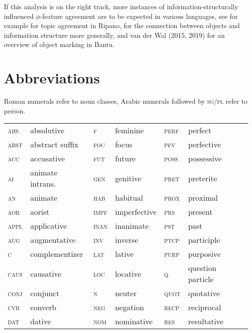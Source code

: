 \documentclass[output=paper
,modfonts
,nonflat]{langsci/langscibook}
\begin{document}
If this analysis is on the right track, more instances of information-structurally influenced $ \phi $-feature agreement are to be expected in various languages, see for example  for topic agreement in Ripano, \citet{Dalrymple_Nikolaeva2011} for the connection between objects and information structure more generally, and van der Wal (2015, 2019) for an overview of object marking in Bantu. \nocite{Van_der_Wal2015,chapters/07-van-der-wal} %

\section*{Abbreviations}
Roman numerals refer to noun classes, Arabic numerals followed by \textsc{sg/pl} refer to person.

\noindent\begin{tabular}{@{}llllll@{}} 
	\textsc{abs} 	&	 absolutive 	&	\textsc{f} 	&	  feminine 	&	  \textsc{perf} 	&	   perfect 	\\
\textsc{abst} 	&	  abstract suffix 	&	  \textsc{foc} 	&	  focus	&	  \textsc{pfv} 	&	  perfective 	\\
\textsc{acc} 	&	  accusative 	&	  \textsc{fut} 	&	  future	&	  \textsc{poss}  	&	 possessive 	\\
\textsc{ai} 	&	  animate intrans. 	&	  \textsc{gen} 	&	  genitive  	&	  \textsc{pret} 	&	  preterite 	\\
\textsc{an} 	&	  animate 	&	  \textsc{hab} 	&	  habitual 	&	  \textsc{prox}  	&	 proximal 	\\
\textsc{aor} 	&	  aorist 	&	  \textsc{impf} 	&	  imperfective	&	  \textsc{prs} 	&	  present 	\\
\textsc{appl} 	&	  applicative 	&	  \textsc{inan} 	&	  inanimate	&	  \textsc{pst} 	&	  past 	\\
\textsc{aug} 	&	  augmentative 	&	  \textsc{inv} 	&	  inverse	&	  \textsc{ptcp} 	&	  participle 	\\
\textsc{c}	&	complementizer	&	  \textsc{lat} 	&	  lative 	&	  \textsc{purp}  	&	 purposive 	\\
\textsc{caus} 	&	  causative 	&	  \textsc{loc} 	&	  locative	&	\textsc{q}	&	question particle	\\
\textsc{conj} 	&	  conjunct 	&	  \textsc{n} 	&	  neuter 	&	  \textsc{quot} 	&	  quotative 	\\
\textsc{cvb} 	&	  converb 	&	  \textsc{neg} 	&	  negation 	&	\textsc{recp}	&	reciprocal	\\
\textsc{dat} 	&	  dative 	&	  \textsc{nom} 	&	  nominative 	&	  \textsc{res} 	&	  resultative 	\\

\end{tabular}
\end{document}
